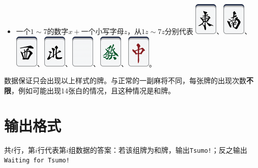 \documentclass[
	lang=cn,
	color=green
]{elegantbook}
\begin{document}
\begin{itemize}
    \item 一个$1 \sim 7$的数字$x+$一个小写字母$z$，从$1z \sim 7z$分别代表 \includegraphics[scale=0.5]{images/mahjong/1z.png}、\includegraphics[scale=0.5]{images/mahjong/2z.png}、\includegraphics[scale=0.5]{images/mahjong/3z.png}、\includegraphics[scale=0.5]{images/mahjong/4z.png}、\includegraphics[scale=0.5]{images/mahjong/5z.png}、\includegraphics[scale=0.5]{images/mahjong/6z.png}、\includegraphics[scale=0.5]{images/mahjong/7z.png}。
\end{itemize}

数据保证只会出现以上样式的牌。与正常的一副麻将不同，每张牌的出现次数\textbf{不限}，例如可能出现14张白的情况，且这种情况是和牌。

\section*{输出格式}
共$t$行，第$i$行代表第$i$组数据的答案：若该组牌为和牌，输出\lstinline{Tsumo!}；反之输出\lstinline{Waiting for Tsumo!}
\end{document}
